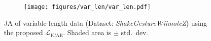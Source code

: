 \begin{figure}[t]
\centering
\begin{subfigure}{0.98\linewidth}
 \centering
{\texttt{[image: figures/var\_len/var\_len.pdf]}}
\end{subfigure}

\caption{JA of variable-length data (Dataset: \textit{ShakeGestureWiimoteZ}) using the proposed $\mathcal{L}_{\mathrm{ICAE}}$. Shaded area is $\pm$ std.~dev.}
\label{fig:var:len}
\end{figure}
